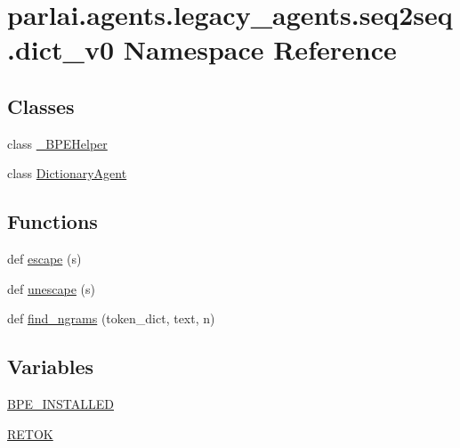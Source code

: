 \hypertarget{namespaceparlai_1_1agents_1_1legacy__agents_1_1seq2seq_1_1dict__v0}{}\section{parlai.\+agents.\+legacy\+\_\+agents.\+seq2seq.\+dict\+\_\+v0 Namespace Reference}
\label{namespaceparlai_1_1agents_1_1legacy__agents_1_1seq2seq_1_1dict__v0}
\subsection*{Classes}
\begin{DoxyCompactItemize}
\item 
class \hyperlink{classparlai_1_1agents_1_1legacy__agents_1_1seq2seq_1_1dict__v0_1_1__BPEHelper}{\+\_\+\+B\+P\+E\+Helper}
\item 
class \hyperlink{classparlai_1_1agents_1_1legacy__agents_1_1seq2seq_1_1dict__v0_1_1DictionaryAgent}{Dictionary\+Agent}
\end{DoxyCompactItemize}
\subsection*{Functions}
\begin{DoxyCompactItemize}
\item 
def \hyperlink{namespaceparlai_1_1agents_1_1legacy__agents_1_1seq2seq_1_1dict__v0_a50d891f5daa90cde2858723889ab0cc8}{escape} (s)
\item 
def \hyperlink{namespaceparlai_1_1agents_1_1legacy__agents_1_1seq2seq_1_1dict__v0_a1803c89a6cc7d5323a31a1f7e79728ed}{unescape} (s)
\item 
def \hyperlink{namespaceparlai_1_1agents_1_1legacy__agents_1_1seq2seq_1_1dict__v0_aa7398720bbf0f8e82c5b1495313f4f8b}{find\+\_\+ngrams} (token\+\_\+dict, text, n)
\end{DoxyCompactItemize}
\subsection*{Variables}
\begin{DoxyCompactItemize}
\item 
\hyperlink{namespaceparlai_1_1agents_1_1legacy__agents_1_1seq2seq_1_1dict__v0_a7f1f272d95d31ea5a58f6263ddab8f89}{B\+P\+E\+\_\+\+I\+N\+S\+T\+A\+L\+L\+ED}
\item 
\hyperlink{namespaceparlai_1_1agents_1_1legacy__agents_1_1seq2seq_1_1dict__v0_aeee7b19e8d0821c373027d0e2b146188}{R\+E\+T\+OK}
\end{DoxyCompactItemize}


